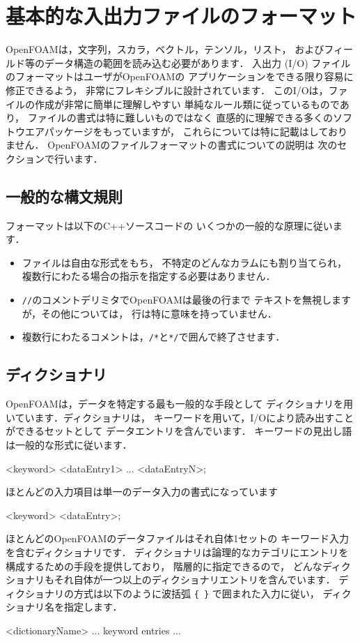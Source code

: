\section{基本的な入出力ファイルのフォーマット}
\label{sec:4.2}
%
%
OpenFOAMは，文字列，スカラ，ベクトル，テンソル，リスト，
およびフィールド等のデータ構造の範囲を読み込む必要があります．
入出力 (I/O) ファイルのフォーマットはユーザがOpenFOAMの
アプリケーションをできる限り容易に修正できるよう，
非常にフレキシブルに設計されています．
このI/Oは，ファイルの作成が非常に簡単に理解しやすい
単純なルール類に従っているものであり，
ファイルの書式は特に難しいものではなく
直感的に理解できる多くのソフトウエアパッケージをもっていますが，
これらについては特に記載はしておりません．
OpenFOAMのファイルフォーマットの書式についての説明は
次のセクションで行います．


\subsection{一般的な構文規則}
\label{ssec:4.2.1}
フォーマットは以下のC++ソースコードの
いくつかの一般的な原理に従います．
\begin{itemize}
 \item ファイルは自由な形式をもち，
       不特定のどんなカラムにも割り当てられ，
       複数行にわたる場合の指示を指定する必要はありません．
 \item %
%
%
       \verb|//|のコメントデリミタでOpenFOAMは最後の行まで
       テキストを無視しますが，その他については，
       行は特に意味を持っていません．
 \item 複数行にわたるコメントは，\verb|/*|と\verb|*/|で囲んで終了させます．
\end{itemize}


\subsection{ディクショナリ}
\label{ssec:4.2.2}
OpenFOAMは，データを特定する最も一般的な手段として
ディクショナリを用いています．ディクショナリは，
キーワードを用いて，I/Oにより読み出すことができるセットとして
データエントリを含んでいます．
キーワードの見出し語は一般的な形式に従います．
\begin{OFverbatim}[file]
<keyword>  <dataEntry1> ... <dataEntryN>;
\end{OFverbatim}
ほとんどの入力項目は単一のデータ入力の書式になっています
\begin{OFverbatim}[file]
<keyword>  <dataEntry>;
\end{OFverbatim}
ほとんどのOpenFOAMのデータファイルはそれ自体1セットの
キーワード入力を含むディクショナリです．
ディクショナリは論理的なカテゴリにエントリを構成するための手段を提供しており，
階層的に指定できるので，
どんなディクショナリもそれ自体が一つ以上のディクショナリエントリを含んでいます．
ディクショナリの方式は以下のように波括弧 \verb|{ }| で囲まれた入力に従い，
ディクショナリ名を指定します．
\begin{OFverbatim}[file]
<dictionaryName>
{
    ... keyword entries ...
}
\end{OFverbatim}


